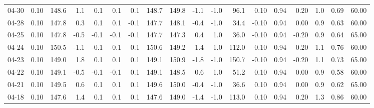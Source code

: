 \begin{threeparttable}
{\begin{tabular}{lrrrrrrrrrrrrrrrrr}
  04-30 &     0.10 & 148.6 &               1.1 &               0.1 &                0.1 &                0.1 & 148.7 & 149.8 &       -1.1 &                     -1.0 &                96.1 &       0.10 &      0.94 &           0.20 &              1.0 &            0.69 &                  60.00 \\
  04-28 &     0.10 & 147.8 &               0.3 &               0.1 &                0.1 &               -0.1 & 147.7 & 148.1 &       -0.4 &                     -1.0 &                34.4 &      -0.10 &      0.94 &           0.00 &              0.9 &            0.63 &                  60.00 \\
  04-25 &     0.10 & 147.8 &              -0.5 &              -0.1 &               -0.1 &               -0.1 & 147.7 & 147.3 &        0.4 &                      1.0 &                36.0 &      -0.10 &      0.94 &          -0.20 &              0.9 &            0.64 &                  65.00 \\
  04-24 &     0.10 & 150.5 &              -1.1 &              -0.1 &               -0.1 &                0.1 & 150.6 & 149.2 &        1.4 &                      1.0 &               112.0 &       0.10 &      0.94 &           0.20 &              1.1 &            0.76 &                  60.00 \\
  04-23 &     0.10 & 149.0 &               1.8 &               0.1 &                0.1 &                0.1 & 149.1 & 150.9 &       -1.8 &                     -1.0 &               150.7 &      -0.10 &      0.94 &          -0.20 &              1.1 &            0.73 &                  65.00 \\
  04-22 &     0.10 & 149.1 &              -0.5 &              -0.1 &               -0.1 &                0.1 & 149.1 & 148.5 &        0.6 &                      1.0 &                51.2 &       0.10 &      0.94 &           0.00 &              0.9 &            0.58 &                  60.00 \\
  04-21 &     0.10 & 149.5 &               0.6 &               0.1 &                0.1 &                0.1 & 149.6 & 150.0 &       -0.4 &                     -1.0 &                36.6 &       0.10 &      0.94 &           0.00 &              0.9 &            0.62 &                  65.00 \\
  04-18 &     0.10 & 147.6 &               1.4 &               0.1 &                0.1 &                0.1 & 147.6 & 149.0 &       -1.4 &                     -1.0 &               113.0 &       0.10 &      0.94 &           0.20 &              1.3 &            0.86 &                  60.00 \\

\end{tabular}}
\end{threeparttable}
